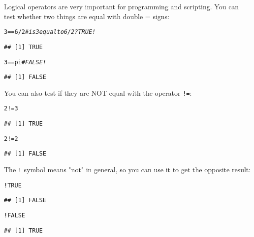 \documentclass[12pt,a4paper]{scrartcl}\usepackage[]{graphicx}\usepackage[]{color}
\makeatletter
\newcommand{\hlnum}[1]{\textcolor[rgb]{0.686,0.059,0.569}{#1}}%
\newcommand{\hlcom}[1]{\textcolor[rgb]{0.678,0.584,0.686}{\textit{#1}}}%
\newcommand{\hlopt}[1]{\textcolor[rgb]{0,0,0}{#1}}%
\newcommand{\hlstd}[1]{\textcolor[rgb]{0.345,0.345,0.345}{#1}}%
\newenvironment{kframe}{%
 \def\at@end@of@kframe{}%
 \ifinner\ifhmode%
  \def\at@end@of@kframe{\end{minipage}}%
  \begin{minipage}{\columnwidth}%
 \fi\fi%
 \def\FrameCommand##1{\hskip\@totalleftmargin \hskip-\fboxsep
 \colorbox{shadecolor}{##1}\hskip-\fboxsep
     \hskip-\linewidth \hskip-\@totalleftmargin \hskip\columnwidth}%
 \MakeFramed {\advance\hsize-\width
   \@totalleftmargin\z@ \linewidth\hsize
   \@setminipage}}%
 {\par\unskip\endMakeFramed%
 \at@end@of@kframe}
\newenvironment{knitrout}{}{} %
\makeatother
\begin{document}
Logical operators are very important for programming and scripting.
You can test whether two things are equal with double = signs:
\begin{knitrout}
\color{fgcolor}\begin{kframe}
\begin{alltt}
\hlnum{3} \hlopt{==} \hlnum{6}\hlopt{/}\hlnum{2} \hlcom{#is 3 equal to 6/2? TRUE!}
\end{alltt}
\begin{verbatim}
## [1] TRUE
\end{verbatim}
\begin{alltt}
\hlnum{3} \hlopt{==} \hlstd{pi}  \hlcom{# FALSE!}
\end{alltt}
\begin{verbatim}
## [1] FALSE
\end{verbatim}
\end{kframe}
\end{knitrout}

You can also test if they are NOT equal with the operator \texttt{!=}:
\begin{knitrout}
\color{fgcolor}\begin{kframe}
\begin{alltt}
\hlnum{2} \hlopt{!=} \hlnum{3}
\end{alltt}
\begin{verbatim}
## [1] TRUE
\end{verbatim}
\begin{alltt}
\hlnum{2} \hlopt{!=} \hlnum{2}
\end{alltt}
\begin{verbatim}
## [1] FALSE
\end{verbatim}
\end{kframe}
\end{knitrout}

The \texttt{!} symbol means "not" in general, so you can use it to get the opposite result:
\begin{knitrout}
\color{fgcolor}\begin{kframe}
\begin{alltt}
\hlopt{!}\hlnum{TRUE}
\end{alltt}
\begin{verbatim}
## [1] FALSE
\end{verbatim}
\begin{alltt}
\hlopt{!}\hlnum{FALSE}
\end{alltt}
\begin{verbatim}
## [1] TRUE
\end{verbatim}
\end{kframe}
\end{knitrout}
\end{document}
